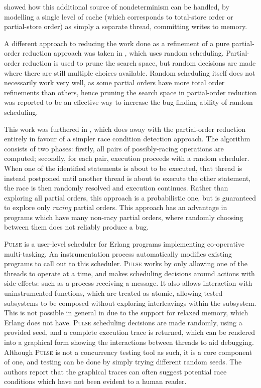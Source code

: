 \citep{rdpor} showed how this additional source of nondeterminism can
be handled, by modelling a single level of cache (which corresponds to
total-store order or partial-store order) as simply a separate thread,
committing writes to memory.


A different approach to reducing the work done as a refinement of a
pure partial-order reduction approach was taken in \citep{rapos},
which uses random scheduling. Partial-order reduction is used to prune
the search space, but random decisions are made where there are still
multiple choices available. Random scheduling itself does not
necessarily work very well, as some partial orders have more total
order refinements than others, hence pruning the search space in
partial-order reduction was reported to be an effective way to
increase the bug-finding ability of random scheduling.

This work was furthered in \citep{racefuzzer}, which does away with
the partial-order reduction entirely in favour of a simpler race
condition detection approach. The algorithm consists of two phases:
firstly, all pairs of possibly-racing operations are computed;
secondly, for each pair, execution proceeds with a random
scheduler. When one of the identified statements is about to be
executed, that thread is instead postponed until another thread is
about to execute the other statement, the race is then randomly
resolved and execution continues. Rather than exploring all partial
orders, this approach is a probabilistic one, but is guaranteed to
explore only \emph{racing} partial orders. This approach has an
advantage in programs which have many non-racy partial orders, where
randomly choosing between them does not reliably produce a bug.


\textsc{Pulse} \citep{pulse} is a user-level scheduler for Erlang
programs implementing co-operative multi-tasking. An instrumentation
process automatically modifies existing programs to call out to this
scheduler. \textsc{Pulse} works by only allowing one of the threads to
operate at a time, and makes scheduling decisions around actions with
side-effects: such as a process receiving a message. It also allows
interaction with uninstrumented functions, which are treated as
atomic, allowing tested subsystems to be composed without exploring
interleavings within the subsystem. This is not possible in general in
\dejafu{} due to the support for relaxed memory, which Erlang does not
have. \textsc{Pulse} scheduling decisions are made randomly, using a
provided seed, and a complete execution trace is returned, which can
be rendered into a graphical form showing the interactions between
threads to aid debugging. Although \textsc{Pulse} is not a concurrency
testing tool as such, it is a core component of one, and testing can
be done by simply trying different random seeds. The authors report
that the graphical traces can often suggest potential race conditions
which have not been evident to a human reader.

